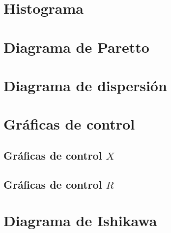
\section{Histograma}




\section{Diagrama de Paretto}




\section{Diagrama de dispersión}




\section{Gráficas de control}



\subsection{Gráficas de control $X$}




\subsection{Gráficas de control $R$}




\section{Diagrama de Ishikawa}


